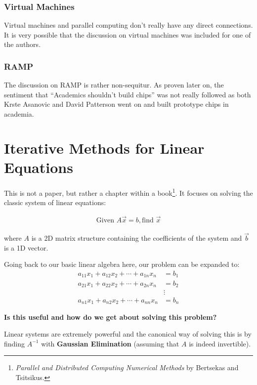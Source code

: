 \subsubsection{Virtual Machines}

Virtual machines and parallel computing don't really have any direct connections. It is very possible that the discussion on virtual machines was included for one of the authors.

\subsubsection{RAMP}

The discussion on RAMP is rather non-sequitur. As proven later on, the sentiment that ``Academics shouldn't build chips'' was not really followed as both Krste Asanovic and David Patterson went on and built prototype chips in academia.

\section{Iterative Methods for Linear Equations}

This is not a paper, but rather a chapter within a book\footnote{\textit{Parallel and Distributed Computing Numerical Methods} by Bertsekas and Tsitsikus.}. It focuses on solving the classic system of linear equations:

\begin{align*}
    \text{Given }A\vec{x} = b, \text{find } \vec{x}
\end{align*}

where \( A \) is a 2D matrix structure containing the coefficients of the system and \( \vec{b} \) is a 1D vector.

Going back to our basic linear algebra here, our problem can be expanded to:
\begin{align*}
    a_{11} x_{1} + a_{12} x_{2} + \cdots + a_{1n} x_{n} &= b_{1} \\
    a_{21} x_{1} + a_{22} x_{2} + \cdots + a_{2n} x_{n} &= b_{2} \\
    & \vdots \\
    a_{n1} x_{1} + a_{n2} x_{2} + \cdots + a_{nn} x_{n} &= b_{n}
\end{align*}

\textbf{Is this useful and how do we get about solving this problem?}

Linear systems are extremely powerful and the canonical way of solving this is by finding \( A^{-1} \) with \textbf{Gaussian Elimination} (assuming that \( A \) is indeed invertible).

